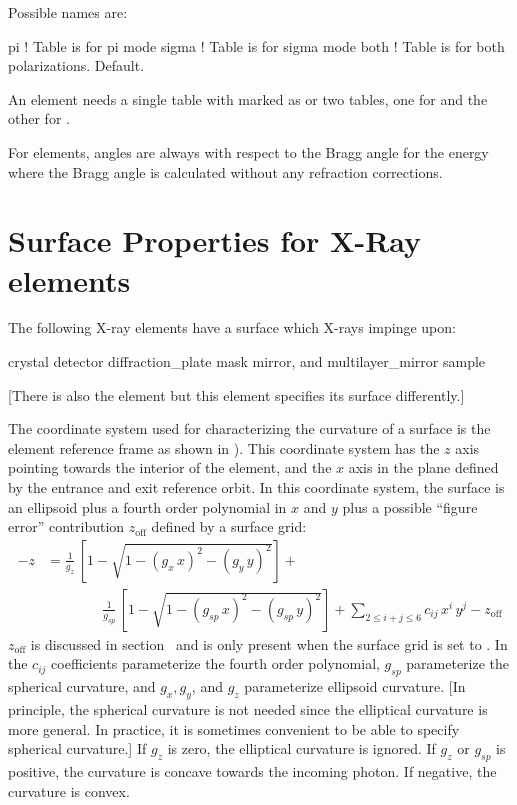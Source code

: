 Possible  names are:
\begin{example}
  pi        ! Table is for pi mode
  sigma     ! Table is for sigma mode
  both      ! Table is for both polarizations. Default.
\end{example}
An element needs a single table with  marked as  or two tables,
one for  and the other for .

For  elements, angles are always with respect to the Bragg angle for the energy where
the Bragg angle is calculated without any refraction corrections.

\section{Surface Properties for X-Ray elements}
\label{s:surface}

The following X-ray elements have a surface which X-rays impinge upon:
\begin{example}
  crystal               
  detector              
  diffraction_plate     
  mask                  
  mirror, and           
  multilayer_mirror     
  sample                
\end{example}
[There is also the  element but this element specifies
its surface differently.]

The coordinate system used for characterizing the curvature of a surface is the element reference
frame as shown in ). This coordinate system has the $z$ axis pointing towards the
interior of the element, and the $x$ axis in the plane defined by the entrance and exit reference
orbit. In this coordinate system, the surface is an ellipsoid plus a fourth order polynomial in $x$
and $y$ plus a possible ``figure error'' contribution $z_\text{off}$ defined by a surface grid:
\begin{align}
  \label{xs2ij4}
  {-z} &= \frac{1}{g_z} \, \left[ 1 - \sqrt{1 - (g_x \, x)^2 - (g_y \, y)^2} \right] + \\
  &\qquad \qquad \frac{1}{g_{sp}} \, \left[ 1 - \sqrt{1 - (g_{sp} \, x)^2 - (g_{sp} \, y)^2} \right] + 
  \sum_{2 \le i+j \le 6} c_{ij} \, x^i \, y^j - z_\text{off} \nonumber
\end{align}
$z_\text{off}$ is discussed in section~ and is only present when the surface grid
 is set to . In  the $c_{ij}$ coefficients parameterize the
fourth order polynomial, $g_{sp}$ parameterize the spherical curvature, and $g_x, g_y$, and $g_z$
parameterize ellipsoid curvature. [In principle, the spherical curvature is not needed since the
elliptical curvature is more general. In practice, it is sometimes convenient to be able to specify
spherical curvature.]  If $g_z$ is zero, the elliptical curvature is ignored. If $g_z$ or $g_{sp}$
is positive, the curvature is concave towards the incoming photon. If negative, the curvature is
convex. 

